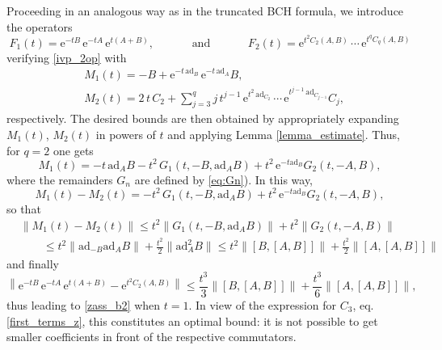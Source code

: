 \documentclass[11pt]{article}
\newcommand{\e}{\ensuremath{\mathrm{e}}}
\newcommand{\ad}{\ensuremath{\mathrm{ad}}}
\begin{document}
Proceeding in an analogous way as in the truncated BCH formula, we introduce the operators
\[
   F_1(t) = \e^{-t B} \, \e^{-t A} \, \e^{t (A+B)}, \qquad\quad \mbox{ and } \quad\qquad F_2(t) =  \e^{t^2 C_2(A,B)} \, \cdots \, \e^{t^q C_q(A,B)} 
\]
verifying \eqref{ivp_2op} with
\begin{equation} \label{bound_z3}
 \begin{aligned}
  & M_1(t) = -B + \e^{-t \, \ad_B} \, \e^{-t \, \ad_A} B, \\
  & M_2(t) =  2 \, t \, C_2 + \sum_{j=3}^q j \, t^{j-1} \, \e^{t^2 \, \ad_{C_2}} \, \cdots \, \e^{t^{j-1} \, \ad_{C_{j-1}}} C_j,
 \end{aligned}
\end{equation}  
respectively. The desired bounds are then obtained by appropriately expanding $M_1(t)$, $M_2(t)$ in powers of $t$ and applying Lemma \ref{lemma_estimate}.
Thus, for $q=2$ one gets
\[
 M_1(t) = - t \, \ad_A B - t^2 \, G_1(t, -B, \ad_A B) + t^2 \, \e^{-t \ad_B} G_2(t, -A, B),
\]
where the remainders $G_n$ are defined by \eqref{eq:Gn}). In this way,
\[
 M_1(t) - M_2(t)  = - t^2 \, G_1(t, -B, \ad_A B) + t^2 \, \e^{-t \ad_B} G_2(t, -A, B),
\]
so that
\[
\begin{aligned}
  & \| M_1(t) - M_2(t) \|  \le t^2 \|G_1(t, -B, \ad_A B)\| + t^2 \| G_2(t, -A, B) \| \\
  		&	\qquad	 \le t^2 \| \ad_{-B} \ad_A B\| + \frac{t^2}{2} \| \ad_A^2 B\| 
 				  \le t^2 \|[B,[A,B]]\| + \frac{t^2}{2} \|[A,[A,B]]\|
\end{aligned}
\]
and finally
\[
 \left\| \e^{-t B} \, \e^{-t A} \, \e^{t (A+B)} -  \e^{t^2 C_2(A,B)} \right\| \le \frac{t^3}{3} \|[B,[A,B]]\| +  \frac{t^3}{6} \|[A,[A,B]]\|,
\]
thus leading to \eqref{zass_b2} when $t=1$. In view of the expression for $C_3$, eq. \eqref{first_terms_z}, this constitutes an optimal bound: 
it is not possible to get smaller coefficients in front of the respective commutators.
\end{document}
